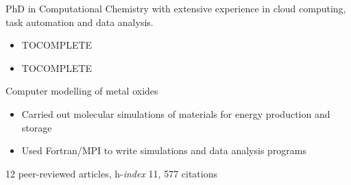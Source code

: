 \documentclass[10pt,a4paper,ragged2e,academicons]{altacv}
\begin{document}

\begin{fullwidth}
\makecvheader
\parbox{.7\paperwidth}{%
PhD in Computational Chemistry with extensive experience in cloud computing, task automation and data analysis.
}

\end{fullwidth}



\begin{itemize}
\item TOCOMPLETE 
\end{itemize}

\divider

\begin{itemize}
\item TOCOMPLETE 
\end{itemize}

\divider

Computer modelling of metal oxides
\smallskip
\begin{itemize}
\item Carried out molecular simulations of materials for energy production and storage
\item Used Fortran/MPI to write simulations and data analysis programs
\end{itemize}
{\small 12 peer-reviewed articles, h-\textit{index} 11, 577 citations}

\end{document}
